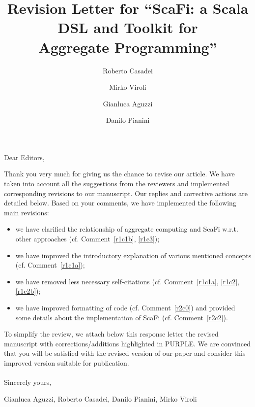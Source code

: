 \documentclass{article}
\newcounter{reviewer}
\newcounter{comment}[reviewer]
\begin{document}
\acused{}

\newcommand{\scafi}[0]{{\sc{}ScaFi}}
\newcommand{\scafiweb}[0]{{\sc{}ScaFi-Web}}

\title{{\Large Revision Letter for} ``\scafi{}: a Scala DSL and Toolkit for\\Aggregate Programming''}
\author{
Roberto Casadei
\and
Mirko Viroli
\and 
Gianluca Aguzzi
\and 
Danilo Pianini
}

\maketitle

Dear Editors, \newline

Thank you very much for giving us the chance to revise our article.
%
We have taken into account all the suggestions from the reviewers and implemented corresponding revisions to our manuscript.
%
Our replies and corrective actions are detailed below.
%
Based on your comments, we have implemented the following main revisions:
%
\begin{itemize}
\item we have clarified the relationship of aggregate computing and ScaFi w.r.t. other approaches (cf. Comment~\ref{r1c1b}, \ref{r1c3});
\item we have improved the introductory explanation of various mentioned concepts (cf. Comment~\ref{r1c1a});
\item we have removed less necessary self-citations (cf. Comment~\ref{r1c1a}, \ref{r1c2}, \ref{r1c2b});
\item we have improved formatting of code (cf. Comment~\ref{r2c0}) and provided some details about the implementation of ScaFi (cf. Comment~\ref{r2c2}).
\end{itemize}
%
To simplify the review, we attach below this response letter the revised manuscript with corrections/additions highlighted in {\color{purple}PURPLE}.
%
We are convinced that you will be satisfied with the revised version of our paper and consider this improved version suitable for publication.
\\ ~ \\

\noindent Sincerely yours,

Gianluca Aguzzi, Roberto Casadei, Danilo Pianini, Mirko Viroli


\raggedbottom

\end{document}

